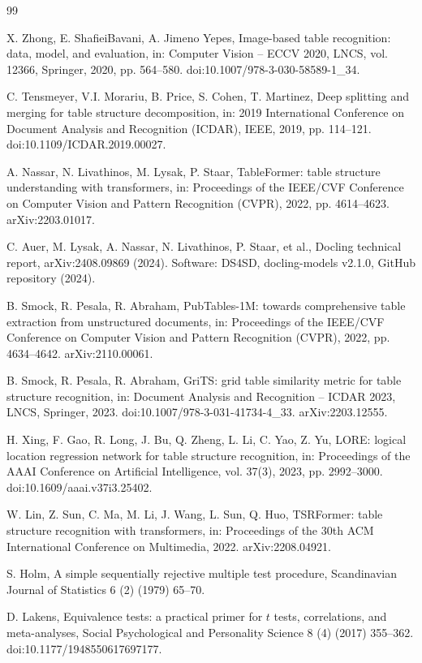 \documentclass[final,5p,times,twocolumn]{elsarticle}
\begin{document}
\begin{thebibliography}{99}

X. Zhong, E. ShafieiBavani, A. Jimeno Yepes,
Image-based table recognition: data, model, and evaluation,
in: Computer Vision -- ECCV 2020, LNCS, vol. 12366, Springer, 2020, pp. 564--580.
doi:10.1007/978-3-030-58589-1\_34.

C. Tensmeyer, V.I. Morariu, B. Price, S. Cohen, T. Martinez,
Deep splitting and merging for table structure decomposition,
in: 2019 International Conference on Document Analysis and Recognition (ICDAR),
IEEE, 2019, pp. 114--121. doi:10.1109/ICDAR.2019.00027.

A. Nassar, N. Livathinos, M. Lysak, P. Staar,
TableFormer: table structure understanding with transformers,
in: Proceedings of the IEEE/CVF Conference on Computer Vision and Pattern
Recognition (CVPR), 2022, pp. 4614--4623. arXiv:2203.01017.

C. Auer, M. Lysak, A. Nassar, N. Livathinos, P. Staar, et al.,
Docling technical report, arXiv:2408.09869 (2024).
Software: DS4SD, docling-models v2.1.0, GitHub repository (2024).

B. Smock, R. Pesala, R. Abraham,
PubTables-1M: towards comprehensive table extraction from unstructured
documents, in: Proceedings of the IEEE/CVF Conference on Computer Vision and
Pattern Recognition (CVPR), 2022, pp. 4634--4642. arXiv:2110.00061.

B. Smock, R. Pesala, R. Abraham,
GriTS: grid table similarity metric for table structure recognition,
in: Document Analysis and Recognition -- ICDAR 2023, LNCS, Springer, 2023.
doi:10.1007/978-3-031-41734-4\_33. arXiv:2203.12555.

H. Xing, F. Gao, R. Long, J. Bu, Q. Zheng, L. Li, C. Yao, Z. Yu,
LORE: logical location regression network for table structure recognition,
in: Proceedings of the AAAI Conference on Artificial Intelligence, vol. 37(3),
2023, pp. 2992--3000. doi:10.1609/aaai.v37i3.25402.

W. Lin, Z. Sun, C. Ma, M. Li, J. Wang, L. Sun, Q. Huo,
TSRFormer: table structure recognition with transformers,
in: Proceedings of the 30th ACM International Conference on Multimedia,
2022. arXiv:2208.04921.

S. Holm,
A simple sequentially rejective multiple test procedure,
Scandinavian Journal of Statistics 6 (2) (1979) 65--70.

D. Lakens,
Equivalence tests: a practical primer for $t$ tests, correlations, and
meta-analyses, Social Psychological and Personality Science 8 (4) (2017)
355--362. doi:10.1177/1948550617697177.

\end{thebibliography}
\end{document}
